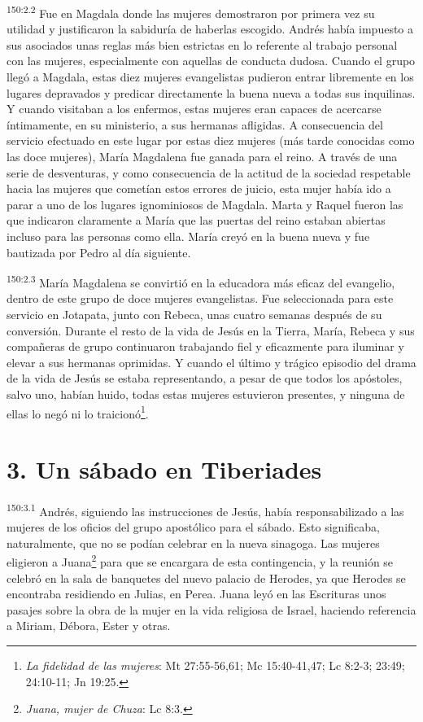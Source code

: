 \par
\textsuperscript{150:2.2} Fue en Magdala donde las mujeres demostraron por primera vez su utilidad y justificaron la sabiduría de haberlas escogido. Andrés había impuesto a sus asociados unas reglas más bien estrictas en lo referente al trabajo personal con las mujeres, especialmente con aquellas de conducta dudosa. Cuando el grupo llegó a Magdala, estas diez mujeres evangelistas pudieron entrar libremente en los lugares depravados y predicar directamente la buena nueva a todas sus inquilinas. Y cuando visitaban a los enfermos, estas mujeres eran capaces de acercarse íntimamente, en su ministerio, a sus hermanas afligidas. A consecuencia del servicio efectuado en este lugar por estas diez mujeres (más tarde conocidas como las doce mujeres), María Magdalena fue ganada para el reino. A través de una serie de desventuras, y como consecuencia de la actitud de la sociedad respetable hacia las mujeres que cometían estos errores de juicio, esta mujer había ido a parar a uno de los lugares ignominiosos de Magdala. Marta y Raquel fueron las que indicaron claramente a María que las puertas del reino estaban abiertas incluso para las personas como ella. María creyó en la buena nueva y fue bautizada por Pedro al día siguiente.

\par
\textsuperscript{150:2.3} María Magdalena se convirtió en la educadora más eficaz del evangelio, dentro de este grupo de doce mujeres evangelistas. Fue seleccionada para este servicio en Jotapata, junto con Rebeca, unas cuatro semanas después de su conversión. Durante el resto de la vida de Jesús en la Tierra, María, Rebeca y sus compañeras de grupo continuaron trabajando fiel y eficazmente para iluminar y elevar a sus hermanas oprimidas. Y cuando el último y trágico episodio del drama de la vida de Jesús se estaba representando, a pesar de que todos los apóstoles, salvo uno, habían huido, todas estas mujeres estuvieron presentes, y ninguna de ellas lo negó ni lo traicionó\footnote{\textit{La fidelidad de las mujeres}: Mt 27:55-56,61; Mc 15:40-41,47; Lc 8:2-3; 23:49; 24:10-11; Jn 19:25.}.

\section*{3. Un sábado en Tiberiades}
\par
\textsuperscript{150:3.1} Andrés, siguiendo las instrucciones de Jesús, había responsabilizado a las mujeres de los oficios del grupo apostólico para el sábado. Esto significaba, naturalmente, que no se podían celebrar en la nueva sinagoga. Las mujeres eligieron a Juana\footnote{\textit{Juana, mujer de Chuza}: Lc 8:3.} para que se encargara de esta contingencia, y la reunión se celebró en la sala de banquetes del nuevo palacio de Herodes, ya que Herodes se encontraba residiendo en Julias, en Perea. Juana leyó en las Escrituras unos pasajes sobre la obra de la mujer en la vida religiosa de Israel, haciendo referencia a Miriam, Débora, Ester y otras.

